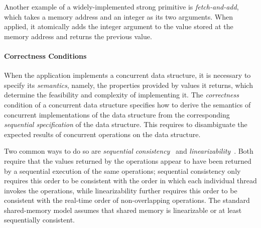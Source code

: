 Another example of a widely-implemented strong primitive is \emph{fetch-and-add}, which takes a memory address and an integer as its two arguments. When applied, it atomically adds the integer argument to the value stored at the memory address and returns the previous value.


\paragraph{Correctness Conditions}
When the application implements a concurrent data structure, it is necessary to specify its \emph{semantics}, namely, the properties provided by values it returns, which
determine the feasibility and complexity of implementing it. The \emph{correctness} condition of a concurrent data structure specifies how to derive the semantics of concurrent implementations of the data structure from the corresponding \emph{sequential specification} of the data structure.
This requires to disambiguate the expected results of concurrent operations on
the data structure.

Two common ways to do so are \emph{sequential consistency}~\cite{LamportSC}
and \emph{linearizability}~\cite{herlihyWingLinearizability}.
Both require that the values returned by the operations appear to have been returned by a sequential
execution of the same operations; sequential consistency only requires this order to be consistent with
the order in which each individual thread invokes the operations, while linearizability further requires
this order to be consistent with the real-time order of non-overlapping operations. The standard shared-memory model assumes that shared memory is linearizable or at least sequentially consistent.

\remove{%
}%

